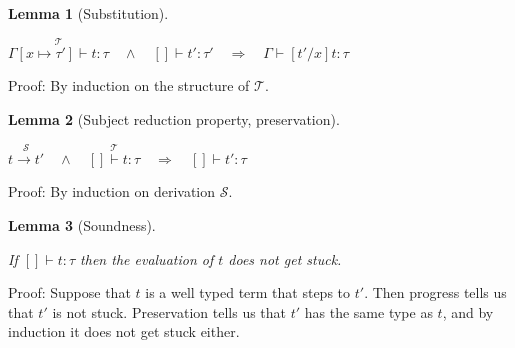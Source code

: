 \documentclass[a4paper]{article}
\newcommand{\s}[1]{\mathtt{#1}}
\newcommand{\im}{\Rightarrow}
\newcommand{\step}{\to}
\newcommand{\T}{\mathcal{T}}
\renewcommand{\S}{\mathcal{S}}
\newcommand{\stackover}[2]{\stackrel{{#2}}{#1}}
\newtheorem{lemma}{Lemma}[section]
\begin{document}
\begin{lemma}[Substitution] $ $
  \label{lemma:substitution}

$\stackover{\Gamma[x \mapsto \tau'] \vdash t: \tau}{\T} \quad \land \quad []\vdash t':\tau' \quad \im \quad
\Gamma \vdash [t'/x]t : \tau$
\end{lemma}

Proof: By induction on the structure of $\T$.


\begin{lemma}[Subject reduction property, preservation] $ $
  \label{lemma:preservation}

$\stackover{t \step t'}{\S} \quad \land \quad \stackover{[] \vdash t: \tau}{\T} \quad \im \quad [] \vdash t' : \tau$
\end{lemma}

Proof: By induction on derivation $\S$.

\begin{lemma}[Soundness] $ $
  \label{lemma:soundness}

If $[] \vdash t : \tau$ then the evaluation of $t$ does not get 
stuck.
\end{lemma}

Proof: Suppose that $t$ is a well typed term that steps to $t'$. 
Then progress tells us that $t'$ is not stuck. 
Preservation tells us that $t'$ has the same type as $t$, 
and by induction it does not get stuck either.

\end{document}
